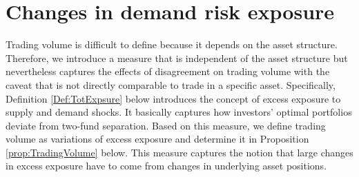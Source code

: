 \section{Changes in demand risk exposure}
Trading volume is difficult to define because it depends on the asset structure. Therefore, we introduce a measure that is independent of the asset structure but nevertheless captures the effects of disagreement on trading volume with the caveat that is not directly comparable to trade in a specific asset. Specifically, Definition \ref{Def:TotExpsure} below introduces the concept of excess exposure to supply and demand shocks. It basically captures how investors' optimal portfolios deviate from two-fund separation. Based on this measure, we define trading volume as variations of excess exposure and determine it in Proposition \ref{prop:TradingVolume} below. This measure captures the notion that large changes in excess exposure have to come from changes in underlying asset positions. 

